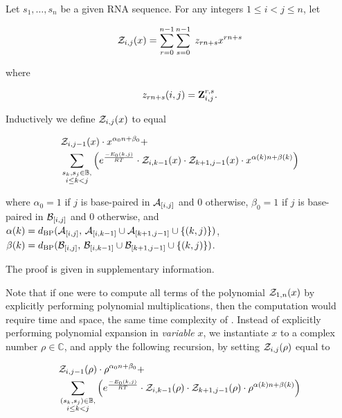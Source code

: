 \begin{theorem}
Let $s_1,\dots,s_n$ be a given RNA sequence.
For any integers $1 \leq i < j \leq n$, let

\begin{align}
{\mathcal Z}_{i,j}(x) = \sum_{r=0}^{n-1} \sum_{s=0}^{n-1}\; z_{rn+s} x^{rn+s}
\end{align}

where

\begin{align}
z_{rn+s}(i,j) = {\bf Z}^{r,s}_{i,j}.
\end{align}

Inductively we define ${\mathcal Z}_{i,j}(x)$ to equal

\begin{align}
\label{eq:ffttwo:polyRecNussJac}
&\emZof{i,j-1}{x} \cdot x^{\alpha_0n+\beta_0} + \\
&\sum_{\substack{s_k,s_j \in \bpSet,\\i\le k<j}}
\left(\boltzNuss{k,j}\cdot
\emZof{i,k-1}{x} \cdot \emZof{k+1,j-1}{x}\cdot x^{\alpha(k)n+\beta(k)} \right)
\end{align}

where $\alpha_0 = 1$ if $j$ is base-paired in $\mathcal A_{[i,j]}$ and $0$ otherwise,
$\beta_0 = 1$ if $j$ is base-paired in $\mathcal B_{[i,j]}$ and $0$ otherwise, and
$\alpha(k) =
d_{\text{BP}}(\mathcal A_{[i,j]},\,\mathcal A_{[i,k-1]} \cup \mathcal A_{[k+1,j-1]} \cup \{ (k,j) \})$,
$\beta(k) =
d_{\text{BP}}(\mathcal B_{[i,j]},\,\mathcal B_{[i,k-1]} \cup \mathcal B_{[k+1,j-1]} \cup \{ (k,j) \})$.

The proof is given in supplementary information.
\end{theorem}

Note that if one were to compute all terms of the polynomial ${\mathcal Z}_{1,n}(x)$
by explicitly performing polynomial multiplications,
then the computation would require  time and  space, the
same time complexity of \cite{hofacker:RNAbor2D}.
Instead of explicitly performing polynomial expansion in {\em variable} $x$,
we instantiate $x$ to a
complex number $\rho \in \mathbb{C}$, and apply
the following recursion, by setting ${\mathcal Z}_{i,j}(\rho)$ equal to

\begin{align}
\label{eq:ffttwo:polyRecNussJacInit}
\begin{split}
&\emZof{i,j-1}{\rho} \cdot \rho^{\alpha_0n+\beta_0} + \\
&\sum_{\substack{(s_k,s_j) \in \bpSet,\\i\le k<j}}
\left(\boltzNuss{k,j}\cdot
\emZof{i,k-1}{\rho} \cdot \emZof{k+1,j-1}{\rho}
\cdot \rho^{\alpha(k)n+\beta(k)} \right)
\end{split}
\end{align}


